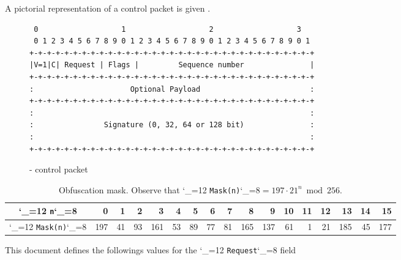 \documentclass{rfc}
\def\ttt{\catcode`\_=12 \tttii}
\def\tttii#1!{{\tt #1}\catcode`\_=8{}}
\begin{document}
A pictorial representation of a control packet is given
. 

\begin{figure}
\begin{center}
\begin{verbatim}
 0                   1                   2                   3
 0 1 2 3 4 5 6 7 8 9 0 1 2 3 4 5 6 7 8 9 0 1 2 3 4 5 6 7 8 9 0 1
+-+-+-+-+-+-+-+-+-+-+-+-+-+-+-+-+-+-+-+-+-+-+-+-+-+-+-+-+-+-+-+-+
|V=1|C| Request | Flags |         Sequence number               |
+-+-+-+-+-+-+-+-+-+-+-+-+-+-+-+-+-+-+-+-+-+-+-+-+-+-+-+-+-+-+-+-+
:                      Optional Payload                         :
+-+-+-+-+-+-+-+-+-+-+-+-+-+-+-+-+-+-+-+-+-+-+-+-+-+-+-+-+-+-+-+-+
:                                                               :
:                Signature (0, 32, 64 or 128 bit)               :
:                                                               :
+-+-+-+-+-+-+-+-+-+-+-+-+-+-+-+-+-+-+-+-+-+-+-+-+-+-+-+-+-+-+-+-+
\end{verbatim}
\end{center}
\caption{\ppetp- control packet \label{fig:control-header}}
\end{figure}

\begin{table}
  \caption{Obfuscation mask.  Observe that \ttt Mask(n)!$=197 \cdot
  21^n \bmod 256$. \label{tbl:obfuscated}} 
\begin{center}
\small
  \begin{tabular}{|c|*{16}r|}
\hline
\ttt n! &
0&  1&  2&  3&  4&  5&  6&  7&  8&  9&  10&  11&  12&  13&  14&  15\\
\hline
\ttt Mask(n)! &
    197&  41&  93& 161&
    53&  89&  77&  81&
    165& 137&  61&   1&
    21& 185&  45& 177\\
\hline
  \end{tabular}
\end{center}
\end{table}
%
This document defines the followings values for the \ttt Request!
field 
\end{document}
